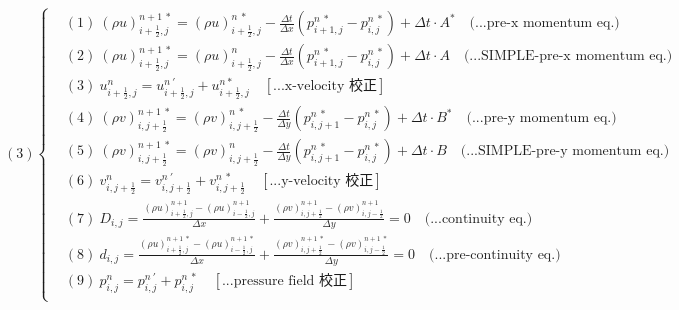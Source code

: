 \documentclass[12pt]{article}
\begin{document}
\begin{equation}
(3)
\left\{
\begin{aligned}
    &(1)\ (\rho u)_{i+\frac{1}{2},j}^{n+1\ *} = (\rho u)_{i+\frac{1}{2},j}^{n\ *} - \frac{\Delta t}{\Delta x}(p_{i+1,j}^{n\ *} - p_{i,j}^{n\ *}) + \Delta t \cdot A^{*}  \quad \text{(...pre-x momentum eq.)}\\[1.5ex]
    &(2)\ (\rho u)_{i+\frac{1}{2},j}^{n+1\ *} = (\rho u)_{i+\frac{1}{2},j}^{n} - \frac{\Delta t}{\Delta x}(p_{i+1,j}^{n\ *} - p_{i,j}^{n\ *}) + \Delta t \cdot A  \quad \text{(...SIMPLE-pre-x momentum eq.)}\\[1.5ex]
    &(3)\ u_{i+\frac{1}{2},j}^{n} = u_{i+\frac{1}{2},j}^{n\ \prime} + u_{i+\frac{1}{2},j}^{n *}  \quad \left[\text{...x-velocity 校正}\right]\\[1.5ex]
    &(4)\ (\rho v)_{i,j+\frac{1}{2}}^{n+1\ *} = (\rho v)_{i,j+\frac{1}{2}}^{n\ *} - \frac{\Delta t}{\Delta y}(p_{i,j+1}^{n\ *} - p_{i,j}^{n\ *}) + \Delta t \cdot B^{*}  \quad \text{(...pre-y momentum eq.)}\\[1.5ex]
    &(5)\ (\rho v)_{i,j+\frac{1}{2}}^{n+1\ *} = (\rho v)_{i,j+\frac{1}{2}}^{n} - \frac{\Delta t}{\Delta y}(p_{i,j+1}^{n\ *} - p_{i,j}^{n\ *}) + \Delta t \cdot B  \quad \text{(...SIMPLE-pre-y momentum eq.)}\\[1.5ex]
    &(6)\ v_{i,j+\frac{1}{2}}^{n} = v_{i,j+\frac{1}{2}}^{n\ \prime} + v_{i,j+\frac{1}{2}}^{n\ *} \quad \left[\text{...y-velocity 校正}\right]\\[1.5ex]
    &(7)\ D_{i,j} = \frac{(\rho u)_{i+\frac{1}{2},j}^{n+1} - (\rho u)_{i-\frac{1}{2},j}^{n+1}}{\Delta x} + \frac{(\rho v)_{i,j+\frac{1}{2}}^{n+1} - (\rho v)_{i,j-\frac{1}{2}}^{n+1}}{\Delta y} = 0 \quad \text{(...continuity eq.)}\\[1.5ex]
    &(8)\ d_{i,j} = \frac{(\rho u)_{i+\frac{1}{2},j}^{n+1\ *} - (\rho u)_{i-\frac{1}{2},j}^{n+1\ *}}{\Delta x} + \frac{(\rho v)_{i,j+\frac{1}{2}}^{n+1\ *} - (\rho v)_{i,j-\frac{1}{2}}^{n+1\ *}}{\Delta y} = 0 \quad \text{(...pre-continuity eq.)}\\[1.5ex]
    &(9)\ p_{i,j}^{n} = p_{i,j}^{n\ \prime} + p_{i,j}^{n\ *} \quad\left[\text{...pressure field 校正}\right]\\[1.5ex]
\end{aligned}
\right.
\end{equation}
\newpage
\end{document}
